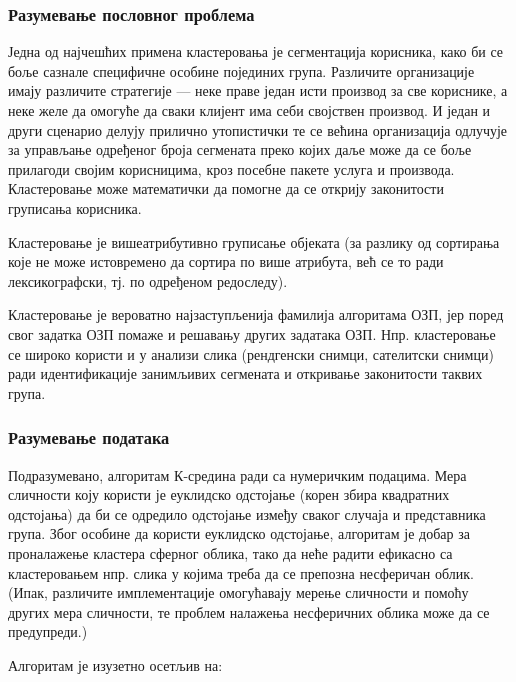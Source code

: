 \subsubsection{Разумевање пословног проблема}
Једна од најчешћих примена кластеровања је сегментација корисника, како би се боље сазнале специфичне особине појединих група. Различите организације имају различите стратегије — неке праве један исти производ за све кориснике, а неке желе да омогуће да сваки клијент има себи својствен производ. И један и други сценарио делују прилично утопистички те се већина организација одлучује за управљање одређеног броја сегмената преко којих даље може да се боље прилагоди својим корисницима, кроз посебне пакете услуга и производа. Кластеровање може математички да помогне да се открију законитости груписања корисника.

Кластеровање је вишеатрибутивно груписање објеката (за разлику од сортирања које не може истовремено да сортира по више атрибута, већ се то ради лексикографски, тј. по одређеном редоследу).

Кластеровање је вероватно најзаступљенија фамилија алгоритама ОЗП, јер поред свог задатка ОЗП помаже и решавању других задатака ОЗП. Нпр. кластеровање се широко користи и у анализи слика (рендгенски снимци, сателитски снимци) ради идентификације занимљивих сегмената и откривање законитости таквих група.

\subsubsection{Разумевање података}
Подразумевано, алгоритам К-средина ради са нумеричким подацима. Мера сличности коју користи је еуклидско одстојање (корен збира квадратних одстојања) да би се одредило одстојање између сваког случаја и представника група. Због особине да користи еуклидско одстојање, алгоритам је добар за проналажење кластера сферног облика, тако да неће радити ефикасно са кластеровањем нпр. слика у којима треба да се препозна несферичан облик. (Ипак, различите имплементације омогућавају мерење сличности и помоћу других мера сличности, те проблем налажења несферичних облика може да се предупреди.)

Алгоритам је изузетно осетљив на:

